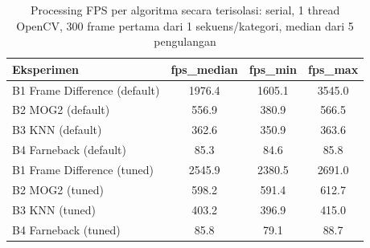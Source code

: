 \begin{table}[t]
\centering
\caption{Processing FPS per algoritma secara terisolasi: serial, 1 thread OpenCV, 300 frame pertama dari 1 sekuens/kategori, median dari 5 pengulangan}
\label{tab:table_fps}
\begin{tabular}{lccc}
\toprule
Eksperimen & fps\_median & fps\_min & fps\_max \\
\midrule
B1 Frame Difference (default) & 1976.4 & 1605.1 & 3545.0 \\
B2 MOG2 (default) & 556.9 & 380.9 & 566.5 \\
B3 KNN (default) & 362.6 & 350.9 & 363.6 \\
B4 Farneback (default) & 85.3 & 84.6 & 85.8 \\
B1 Frame Difference (tuned) & 2545.9 & 2380.5 & 2691.0 \\
B2 MOG2 (tuned) & 598.2 & 591.4 & 612.7 \\
B3 KNN (tuned) & 403.2 & 396.9 & 415.0 \\
B4 Farneback (tuned) & 85.8 & 79.1 & 88.7 \\
\bottomrule
\end{tabular}
\end{table}
